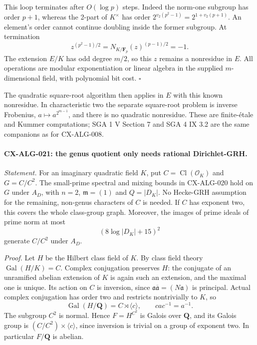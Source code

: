 \documentclass[11pt,a4paper]{article}
\begin{document}
This loop terminates after $O(\log p)$ steps. Indeed the norm-one subgroup
has order $p+1$, whereas the 2-part of $K^\times$ has order
$2^{v_2(p^2-1)}=2^{1+v_2(p+1)}$. An element's order cannot continue
doubling inside the former subgroup. At termination
\[
        z^{(p^2-1)/2}
          =N_{K/\mathbf F_p}(z)^{(p-1)/2}=-1.
\]
The extension $E/K$ has odd degree $m/2$, so this $z$ remains a nonresidue
in $E$. All operations are modular exponentiation or linear algebra in
the supplied $m$-dimensional field, with polynomial bit cost.
\hfill$\square$

The quadratic square-root algorithm then applies in $E$ with this known
nonresidue. In characteristic two the separate square-root problem is
inverse Frobenius, $a\mapsto a^{2^{m-1}}$, and there is no quadratic
nonresidue. These are finite-\'etale and Kummer computations; SGA 1 V
Section 7 and SGA 4 IX 3.2 are the same companions as for CX-ALG-008.

\paragraph{CX-ALG-021: the genus quotient only needs rational Dirichlet-GRH.}
\emph{Statement.} For an imaginary quadratic field $K$, put
$C=\operatorname{Cl}(\mathcal O_K)$ and $G=C/C^2$. The small-prime
spectral and mixing bounds in CX-ALG-020 hold on $G$ under $A_D$, with
$n=2$, $\mathfrak m=(1)$ and $Q=|D_K|$. No Hecke-GRH assumption for
the remaining, non-genus characters of $C$ is needed. If $C$ has exponent
two, this covers the whole class-group graph.
Moreover, the images of prime ideals of prime norm at most
\[
                         (8\log|D_K|+15)^2
\]
generate $C/C^2$ under $A_D$.

\emph{Proof.} Let $H$ be the Hilbert class field of $K$.
By class field theory $\operatorname{Gal}(H/K)=C$. Complex conjugation
preserves $H$: the conjugate of an unramified abelian extension of $K$
is again such an extension, and the maximal one is unique. Its action on
$C$ is inversion, since
$\mathfrak a\overline{\mathfrak a}=(N\mathfrak a)$ is principal.
Actual complex conjugation has order two and restricts nontrivially to
$K$, so
\[
       \operatorname{Gal}(H/\mathbf Q)=C\rtimes\langle c\rangle,
                    \qquad cac^{-1}=a^{-1}.
\]
The subgroup $C^2$ is normal. Hence $F=H^{C^2}$ is Galois over
$\mathbf Q$, and its Galois group is
$(C/C^2)\times\langle c\rangle$, since inversion is trivial on a group
of exponent two. In particular $F/\mathbf Q$ is abelian.
\end{document}
